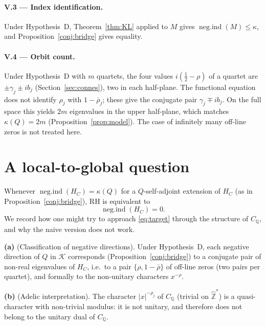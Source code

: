 \documentclass[11pt]{amsart}
\newcommand{\kap}{\kappa}
\newcommand{\negind}{\operatorname{neg.ind}}
\newcommand{\CQ}{C_{\mathbb{Q}}}
\newcommand{\Kcal}{\mathcal{K}}
\begin{document}
\medskip
\paragraph{\textbf{V.3} --- Index identification.}
Under Hypothesis~D, Theorem~\ref{thm:KL} applied to $M$ gives $\negind(M)\le\kap$, and
Proposition~\ref{conj:bridge} gives equality.

\medskip
\paragraph{\textbf{V.4} --- Orbit count.}
Under Hypothesis~D with $m$ quartets, the four values $i(\tfrac12-\rho)$ of a quartet are
$\pm\gamma_j\pm ib_j$ (Section~\ref{sec:connes}), two in each half-plane.  The functional
equation does not identify $\rho_j$ with $1-\bar\rho_j$; these give the conjugate pair
$\gamma_j\mp ib_j$.  On the full space this yields $2m$ eigenvalues in the upper half-plane,
which matches $\kap(Q)=2m$ (Proposition~\ref{prop:model}).  The case of infinitely many off-line zeros is
not treated here.

\section{A local-to-global question}
\label{sec:local-global}

Whenever $\negind(H_C)=\kap(Q)$ for a $Q$-self-adjoint extension of $H_C$ (as in
Proposition~\ref{conj:bridge}), RH is equivalent to
\begin{equation}\label{eq:target}
  \negind(H_C) = 0.
\end{equation}
We record how one might try to approach \eqref{eq:target} through the structure of
$\CQ$, and why the naive version does not work.

\medskip
\textbf{(a)} (Classification of negative directions).  Under Hypothesis~D, each negative
direction of $Q$ in $\Kcal$ corresponds (Proposition~\ref{conj:bridge}) to a conjugate pair
of non-real eigenvalues of $H_C$, i.e.\ to a pair $\{\rho,1-\bar\rho\}$ of off-line zeros (two pairs per quartet),
and formally to the non-unitary characters $x^{-\rho}$.

\medskip
\textbf{(b)} (Adelic interpretation).  The character $|x|^{-\rho_j}$ of $\CQ$ (trivial on
$\hat{\mathbb Z}^*$) is a quasi-character with non-trivial modulus: it is not unitary, and
therefore does not belong to the unitary dual of $\CQ$.
\end{document}
